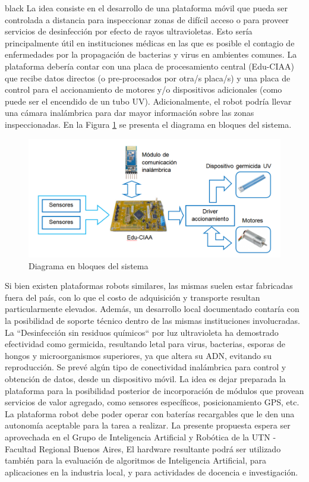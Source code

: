 \documentclass[11pt]{charter}
\begin{document}
\begin{consigna}{black}
 La idea consiste en el desarrollo de una plataforma móvil que pueda ser controlada a distancia para inspeccionar zonas de difícil acceso o para proveer servicios de desinfección por efecto de rayos ultravioletas. Esto sería principalmente útil en instituciones médicas en las que es posible el contagio de enfermedades por la propagación de bacterias y virus en ambientes comunes.
La plataforma debería contar con una placa de procesamiento central (Edu-CIAA) que recibe datos directos (o pre-procesados por otra/s placa/s) y una placa de control para el accionamiento de motores y/o dispositivos adicionales (como puede ser el encendido de un tubo UV).
Adicionalmente, el robot podría llevar una cámara inalámbrica para dar mayor información sobre las zonas inspeccionadas. En la Figura \ref{fig:diagBloques} se presenta el diagrama en bloques del sistema. 

\vspace{25px}

\begin{figure}[htpb]
\centering 
\includegraphics[width=.9\textwidth]{./Figuras/diagBloques.png}
\caption{Diagrama en bloques del sistema}
\label{fig:diagBloques}
\end{figure}

\vspace{25px}

Si bien existen plataformas robots similares, las mismas suelen estar fabricadas fuera del país, con lo que el costo de adquisición y transporte resultan particularmente elevados. Además, un desarrollo local documentado contaría con la posibilidad de soporte técnico dentro de las mismas instituciones involucradas.
La “Desinfección sin residuos químicos“ por luz ultravioleta ha demostrado efectividad como germicida, resultando letal para virus, bacterias, esporas de hongos y microorganismos superiores, ya que altera su ADN, evitando su reproducción.
Se prevé algún tipo de conectividad inalámbrica para control y obtención de datos, desde un dispositivo móvil. La idea es dejar preparada la plataforma para la posibilidad posterior de incorporación de módulos que provean servicios de valor agregado, como sensores específicos, posicionamiento GPS, etc.
La plataforma robot debe poder operar con baterías recargables que le den una autonomía aceptable para la tarea a realizar.
La presente propuesta espera ser aprovechada en el Grupo de Inteligencia Artificial y Robótica de la UTN - Facultad Regional Buenos Aires, El hardware resultante podrá ser utilizado también para la evaluación de algoritmos de Inteligencia Artificial, para aplicaciones en la industria local, y para actividades de docencia e investigación.


\end{consigna}
\end{document}
